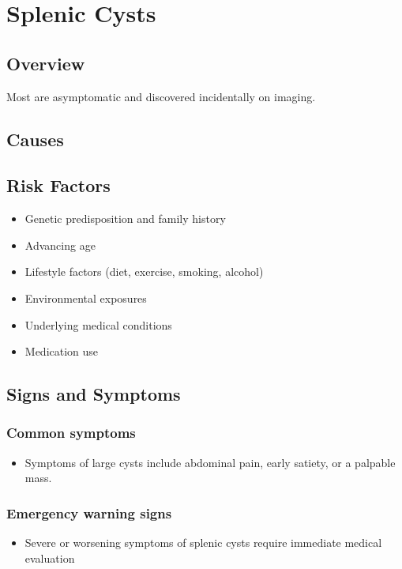 \chapter{Splenic Cysts}
\label{sec:Splenic Cysts}

\section{Overview}
Most are asymptomatic and discovered incidentally on imaging.
\section{Causes}
\section{Risk Factors}

\begin{itemize}[noitemsep]
  \item Genetic predisposition and family history
  \item Advancing age
  \item Lifestyle factors (diet, exercise, smoking, alcohol)
  \item Environmental exposures
  \item Underlying medical conditions
  \item Medication use
\end{itemize}
\section{Signs and Symptoms}

\subsection{Common symptoms}
\begin{itemize}[noitemsep]
  \item Symptoms of large cysts include abdominal pain, early satiety, or a palpable mass. 
  \end{itemize}

\subsection{Emergency warning signs}
\begin{itemize}[noitemsep]
  \item Severe or worsening symptoms of splenic cysts require immediate medical evaluation
\end{itemize}
